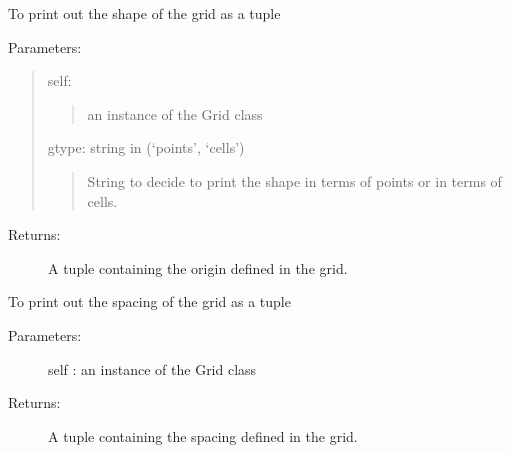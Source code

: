 \documentclass[letterpaper,10pt,english]{sphinxmanual}
\begin{document}
\begin{fulllineitems}
\begin{fulllineitems}
\begin{description}
\begin{description}
\end{description}

\end{description}

\end{fulllineitems}


\begin{fulllineitems}
\label{\detokenize{appendices:s2Dcd.grid.Grid.shape}}
To print out the shape of the grid as a tuple

Parameters:
\begin{quote}

self:
\begin{quote}

an instance of the Grid class
\end{quote}

gtype: string in (‘points’, ‘cells’)
\begin{quote}

String to decide to print the shape in terms of points
or in terms of cells.
\end{quote}
\end{quote}
\begin{description}
\item[{Returns:}] \leavevmode
A tuple containing the origin defined in the grid.

\end{description}

\end{fulllineitems}


\begin{fulllineitems}
\label{\detokenize{appendices:s2Dcd.grid.Grid.spacing}}
To print out the spacing of the grid as a tuple
\begin{description}
\item[{Parameters:}] \leavevmode
self : an instance of the Grid class

\item[{Returns:}] \leavevmode
A tuple  containing the spacing defined in the grid.

\end{description}

\end{fulllineitems}


\end{fulllineitems}
\end{document}
